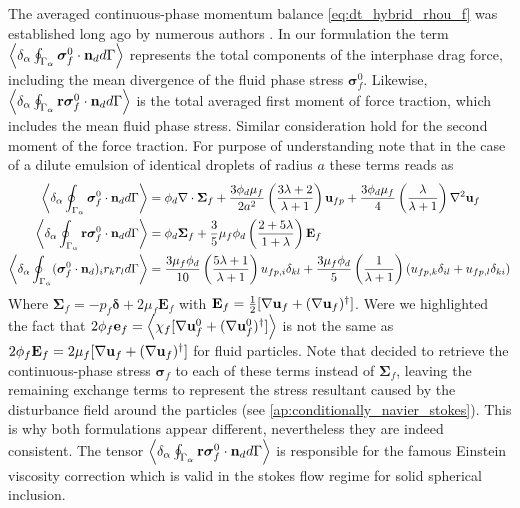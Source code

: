 The averaged continuous-phase momentum balance \eqref{eq:dt_hybrid_rhou_f} was established long ago by numerous authors \citep{zhang1997momentum,jackson1997locally,drew1983mathematical,kataoka1986local}.  
In our formulation the term $\left<\delta_\alpha \oint_{\Gamma_\alpha} \bm{\sigma}_f^0 \cdot \textbf{n}_d d\Gamma\right>$ represents the total components of the interphase drag force, including the mean divergence of the fluid phase stress $\bm\sigma_f^0$. 
Likewise, $\left<\delta_\alpha \oint_{\Gamma_\alpha} \textbf{r}\bm{\sigma}_f^0 \cdot \textbf{n}_d d\Gamma\right>$ is the total averaged first moment of force traction, which includes the mean fluid phase stress. 
Similar consideration hold for the second moment of the force traction. 
For purpose of understanding note that in the case of a dilute emulsion of identical droplets of radius $a$ these terms reads as
\begin{align}
    \left<\delta_\alpha \oint_{\Gamma_\alpha} \bm{\sigma}_f^0\cdot \textbf{n}_d d\Gamma\right> &= 
    \phi_d \mathbf{\nabla}\cdot\bm\Sigma_f
    + \frac{3\phi_d\mu_f}{2 a^2} 
    \left(\frac{3\lambda+2}{\lambda+1}\right) \textbf{u}_{f p} 
    + \frac{3\phi_d\mu_f}{4} \left(\frac{\lambda}{\lambda+1}\right)\mathbf{\nabla}^2\textbf{u}_f\\
    \label{eq:first_mom}
    \left<\delta_\alpha \oint_{\Gamma_\alpha} \textbf{r}\bm{\sigma}_f^0 \cdot \textbf{n}_d d\Gamma\right> 
    &= \phi_d \bm\Sigma_f + 
    \frac{3}{5}\mu_f \phi_d \left(\frac{2+5\lambda}{1+\lambda}\right)
    \textbf{E}_f
        \\
        \left<\delta_\alpha \oint_{\Gamma_\alpha} (\bm{\sigma}_f^0 \cdot \textbf{n}_d)_ir_kr_l d\Gamma\right> &=
        \frac{3\mu_f\phi_d}{10}\left(\frac{5\lambda+1}{\lambda+1}\right)u_{fp,i}\delta_{kl}
        + \frac{3\mu_f\phi_d}{5}\left(\frac{1}{\lambda+1}\right)(u_{fp,k}\delta_{il}+u_{fp,l}\delta_{ki})
\end{align}
Where $\bm\Sigma_f = -p_f \bm\delta+2\mu_f \textbf{E}_f$ with $\textbf{E}_f = \frac{1}{2}[\mathbf{\nabla} \textbf{u}_f+(\mathbf{\nabla} \textbf{u}_f)^\dagger]$.
Were we highlighted the fact that $2\phi_f \textbf{e}_f = \left<\chi_f [\mathbf{\nabla} \textbf{u}_f^0+(\mathbf{\nabla} \textbf{u}_f^0)^\dagger]\right>$ is not the same as $2\phi_f \textbf{E}_f = 2 \mu_f [\mathbf{\nabla} \textbf{u}_f+(\mathbf{\nabla} \textbf{u}_f)^\dagger]$ for fluid particles.
Note that \citet{zhang1997momentum} decided to retrieve the continuous-phase stress $\bm\sigma_f$ to each of these terms instead of $\bm\Sigma_f$, leaving the remaining exchange terms to represent the stress resultant caused by the disturbance field around the particles (see \ref{ap:conditionally_navier_stokes}). 
This is why both formulations appear different, nevertheless they are indeed consistent.
The tensor $\left<\delta_\alpha \oint_{\Gamma_\alpha} \textbf{r}\bm{\sigma}_f^0 \cdot \textbf{n}_d d\Gamma\right>$ is responsible for the famous Einstein viscosity correction \citep{guazzelli2011} which is valid in the stokes flow regime for solid spherical inclusion. 
